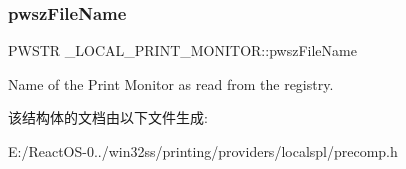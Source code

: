 \subsubsection{\texorpdfstring{pwsz\+File\+Name}{pwszFileName}}
{\footnotesize\ttfamily P\+W\+S\+TR \+\_\+\+L\+O\+C\+A\+L\+\_\+\+P\+R\+I\+N\+T\+\_\+\+M\+O\+N\+I\+T\+O\+R\+::pwsz\+File\+Name}

Name of the Print Monitor as read from the registry. 

该结构体的文档由以下文件生成\+:\begin{DoxyCompactItemize}
\item 
E\+:/\+React\+O\+S-\/0../win32ss/printing/providers/localspl/precomp.\+h\end{DoxyCompactItemize}
